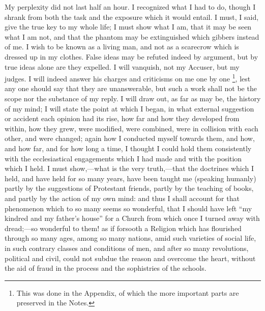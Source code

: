 My perplexity did not last half an hour. I recognized what I had to
do, though I shrank from both the task and the exposure which it would
entail. I must, I said, give the true key to my whole life; I must
show what I am, that it may be seen what I am not, and that
the phantom may be extinguished which gibbers instead of me. I wish to
be known as a living man, and not as a scarecrow which is dressed up
in my clothes. False ideas may be refuted indeed by argument, but by
true ideas alone are they expelled. I will vanquish, not my Accuser,
but my judges. I will indeed answer his charges and criticisms on me
one by one \footnote{This was done in
the Appendix, of which the more important parts are preserved in the
Notes.}, lest any
one should say that they are unanswerable, but such a work shall not
be the scope nor the substance of my reply. I will draw out, as far as
may be, the history of my mind; I will state the point at which I
began, in what external suggestion or accident each opinion had its
rise, how far and how they developed from within, how they
grew, were modified, were combined, were in collision with each
other, and were changed; again how I conducted myself towards them,
and how, and how far, and for how long a time, I thought I could hold
them consistently with the ecclesiastical engagements which I had made
and with the position which I held. I must show,—what is the very truth,—that the doctrines
which I held, and have held for so many years, have been taught me
(speaking humanly) partly by the suggestions of Protestant friends,
partly by the teaching of books, and partly by the action of my own
mind: and thus I shall account for that phenomenon which to so many
seems so wonderful, that I should have left ``my kindred and my
father's house'' for a Church from which once I turned away with
dread;—so wonderful to them! as if forsooth a Religion which has
flourished through so many ages, among so many nations, amid such
varieties of social life, in such contrary classes and conditions of
men, and after so many revolutions, political and civil, could not
subdue the reason and overcome the heart, without the aid of fraud in the process and the sophistries of the schools.

